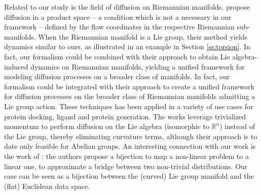 Related to our study is the field of diffusion on Riemannian manifolds. \citet{de2022riemannian} propose diffusion in a product space -- a condition which is not a necessary in our framework -- defined by the flow coordinates in the respective Riemannian sub-manifolds. When the Riemannian manifold is a Lie group, 
their method yields dynamics similar to ours, as illustrated in an example in Section \ref{ss:torsion}. 
In fact, our formalism could be combined with their approach to obtain Lie algebra-induced dynamics on Riemannian manifolds, yielding a unified framework for modeling diffusion processes on a broader class of manifolds.
In fact, our formalism could be integrated with their approach to create a unified framework for diffusion processes on the broader class of Riemannian manifolds admitting a Lie group action. 
These techniques has been applied in a variety of use cases \citep{corso2022diffdock, ketata2023diffdock, pmlr-v202-yim23a, jing2022torsional} for protein docking, ligand and protein generation.
The works \citet{zhu2024trivialized, kong2024convergence}
leverage trivialized momentum to perform diffusion on the Lie algebra (isomorphic to \(\mathbb{R}^n\)) instead of the Lie group, thereby eliminating curvature terms, although their approach is to date only feasible for Abelian groups. 
An interesting connection with our work is the work of \citet{kim2022maximum}: the authors propose a bijection to map a non-linear problem to a linear one, to approximate a bridge between two non-trivial distributions. Our case can be seen as a bijection between the (curved) Lie group manifold and the (flat) Euclidean data space.